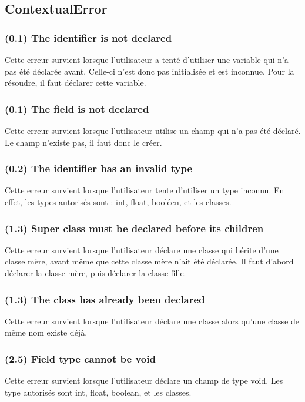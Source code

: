 \documentclass[12pt, a4paper, one side]{article}
\begin{document}
\subsection{ContextualError}
\subsubsection{(0.1) The identifier is not declared}
Cette erreur survient lorsque l'utilisateur a tenté d'utiliser une variable qui n'a pas été déclarée avant. Celle-ci n'est donc
pas initialisée et est inconnue. Pour la résoudre, il faut déclarer cette variable.

\subsubsection{(0.1) The field is not declared}
Cette erreur survient lorsque l'utilisateur utilise un champ qui n'a pas été déclaré. Le champ n'existe pas, il faut donc le créer.

\subsubsection{(0.2) The identifier has an invalid type}
Cette erreur survient lorsque l'utilisateur tente d'utiliser un type inconnu. En effet, les types autorisés sont : int, float, booléen, et les classes.

\subsubsection{(1.3) Super class must be declared before its children}
Cette erreur survient lorsque l'utilisateur déclare une classe qui hérite d'une classe mère, avant même que cette classe mère n'ait été déclarée. Il faut d'abord déclarer la classe mère, puis déclarer la classe fille.

\subsubsection{(1.3) The class has already been declared}
Cette erreur survient lorsque l'utilisateur déclare une classe alors qu'une classe de même nom existe déjà.

\subsubsection{(2.5) Field type cannot be void}
Cette erreur survient lorsque l'utilisateur déclare un champ de type void. Les type autorisés sont int, float, boolean, et les classes.
\end{document}
